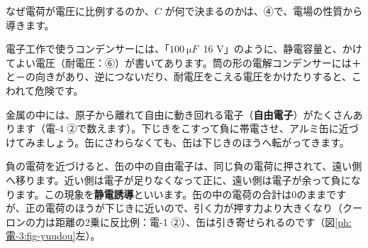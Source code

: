 \noindent なぜ電荷が電圧に比例するのか、$C$ が何で決まるのかは、④で、電場の性質から導きます。

\begin{phmijika}[コンデンサーの表示]
電子工作で使うコンデンサーには、「$\qty{100}{\micro F}$\ 16 V」のように、静電容量と、かけてよい電圧（耐電圧：⑥）が書いてあります。筒の形の電解コンデンサーには＋と－の向きがあり、逆につないだり、耐電圧をこえる電圧をかけたりすると、こわれて危険です。
\end{phmijika}


\label{ph:電-3:sec2}
金属の中には、原子から離れて自由に動き回れる電子（\textbf{自由電子}）がたくさんあります（電-4 ②で数えます）。下じきをこすって負に帯電させ、アルミ缶に近づけてみましょう。缶にさわらなくても、缶は下じきのほうへ転がってきます。

負の電荷を近づけると、缶の中の自由電子は、同じ負の電荷に押されて、遠い側へ移ります。近い側は電子が足りなくなって正に、遠い側は電子が余って負になります。この現象を\textbf{静電誘導}といいます。缶の中の電荷の合計は0のままですが、正の電荷のほうが下じきに近いので、引く力が押す力より大きくなり（クーロンの力は距離の2乗に反比例：電-1 ②）、缶は引き寄せられるのです（図\ref{ph:電-3:fig-yuudou}左）。

